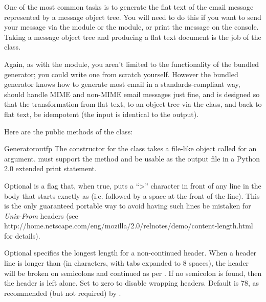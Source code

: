 
One of the most common tasks is to generate the flat text of the email
message represented by a message object tree.  You will need to do
this if you want to send your message via the 
module or the  module, or print the message on the
console.  Taking a message object tree and producing a flat text
document is the job of the  class.

Again, as with the  module, you aren't limited
to the functionality of the bundled generator; you could write one
from scratch yourself.  However the bundled generator knows how to
generate most email in a standards-compliant way, should handle MIME
and non-MIME email messages just fine, and is designed so that the
transformation from flat text, to an object tree via the
 class,
and back to flat text, be idempotent (the input is identical to the
output).

Here are the public methods of the  class:

\begin{classdesc}{Generator}{outfp}
The constructor for the  class takes a file-like
object called  for an argument.   must support
the  method and be usable as the output file in a
Python 2.0 extended print statement.

Optional  is a flag that, when true, puts a ``>''
character in front of any line in the body that starts exactly as
 (i.e.  followed by a space at the front of the
line).  This is the only guaranteed portable way to avoid having such
lines be mistaken for \emph{Unix-From} headers (see
{http://home.netscape.com/eng/mozilla/2.0/relnotes/demo/content-length.html}
for details).

Optional  specifies the longest length for a
non-continued header.  When a header line is longer than
 (in characters, with tabs expanded to 8 spaces),
the header will be broken on semicolons and continued as per
.  If no semicolon is found, then the header is left alone.
Set to zero to disable wrapping headers.  Default is 78, as
recommended (but not required) by .
\end{classdesc}

